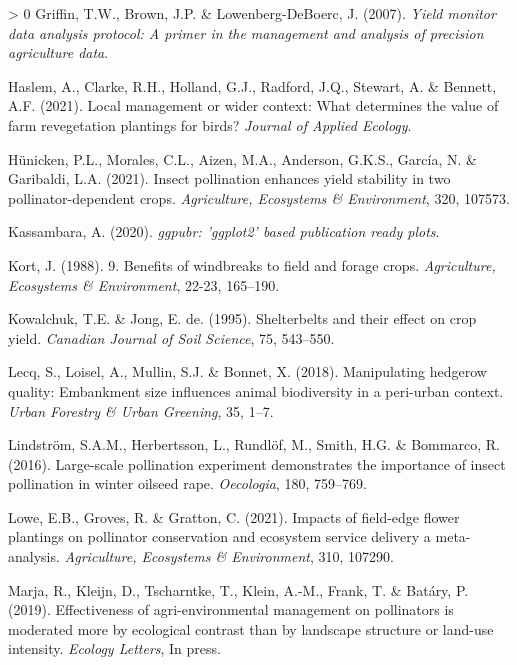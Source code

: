 \documentclass[]{elsarticle} %
\newlength{\cslhangindent}
\newenvironment{CSLReferences}[3] %
 {%
  \setlength{\parindent}{0pt}
  \ifodd #1 \everypar{\setlength{\hangindent}{\cslhangindent}}\ignorespaces\fi
  \ifnum #2 > 0
  \setlength{\parskip}{#2\baselineskip}
  \fi
 }%
 {}
\begin{document}
\begin{CSLReferences}{1}{0}
\leavevmode\hypertarget{ref-griffin2007}{}%
Griffin, T.W., Brown, J.P. \& Lowenberg-DeBoerc, J. (2007). \emph{Yield monitor data analysis protocol: A primer in the management and analysis of precision agriculture data}.

\leavevmode\hypertarget{ref-haslem2021}{}%
Haslem, A., Clarke, R.H., Holland, G.J., Radford, J.Q., Stewart, A. \& Bennett, A.F. (2021). Local management or wider context: What determines the value of farm revegetation plantings for birds? \emph{Journal of Applied Ecology}.

\leavevmode\hypertarget{ref-hunicken2021}{}%
Hünicken, P.L., Morales, C.L., Aizen, M.A., Anderson, G.K.S., García, N. \& Garibaldi, L.A. (2021). Insect pollination enhances yield stability in two pollinator-dependent crops. \emph{Agriculture, Ecosystems {\&} Environment}, 320, 107573.

\leavevmode\hypertarget{ref-kassambara2020}{}%
Kassambara, A. (2020). \emph{{ggpubr}: 'ggplot2' based publication ready plots}.

\leavevmode\hypertarget{ref-kort1988}{}%
Kort, J. (1988). 9. Benefits of windbreaks to field and forage crops. \emph{Agriculture, Ecosystems {\&} Environment}, 22-23, 165--190.

\leavevmode\hypertarget{ref-kowalchuk1995}{}%
Kowalchuk, T.E. \& Jong, E. de. (1995). Shelterbelts and their effect on crop yield. \emph{Canadian Journal of Soil Science}, 75, 543--550.

\leavevmode\hypertarget{ref-lecq2018}{}%
Lecq, S., Loisel, A., Mullin, S.J. \& Bonnet, X. (2018). Manipulating hedgerow quality: Embankment size influences animal biodiversity in a peri-urban context. \emph{Urban Forestry {\&} Urban Greening}, 35, 1--7.

\leavevmode\hypertarget{ref-lindstrom2016}{}%
Lindström, S.A.M., Herbertsson, L., Rundlöf, M., Smith, H.G. \& Bommarco, R. (2016). Large-scale pollination experiment demonstrates the importance of insect pollination in winter oilseed rape. \emph{Oecologia}, 180, 759--769.

\leavevmode\hypertarget{ref-lowe2021}{}%
Lowe, E.B., Groves, R. \& Gratton, C. (2021). Impacts of field-edge flower plantings on pollinator conservation and ecosystem service delivery {{}} a meta-analysis. \emph{Agriculture, Ecosystems {\&} Environment}, 310, 107290.

\leavevmode\hypertarget{ref-marja2019}{}%
Marja, R., Kleijn, D., Tscharntke, T., Klein, A.-M., Frank, T. \& Batáry, P. (2019). Effectiveness of agri-environmental management on pollinators is moderated more by ecological contrast than by landscape structure or land-use intensity. \emph{Ecology Letters}, In press.


\end{CSLReferences}
\end{document}
